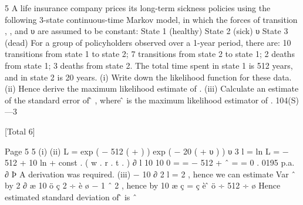 \documentclass[a4paper,12pt]{article}
\begin{document}
5
A life insurance company prices its long-term sickness policies using the following
3-state continuous-time Markov model, in which the forces of transition \sigma, \rho, \mu
and υ are assumed to be constant:
\sigma
State 1
(healthy)
\mu
State 2
(sick)
\rho
υ
State 3
(dead)
For a group of policyholders observed over a 1-year period, there are:
10 transitions from state 1 to state 2;
7 transitions from state 2 to state 1;
2 deaths from state 1;
3 deaths from state 2.
The total time spent in state 1 is 512 years, and in state 2 is 20 years.
(i) Write down the likelihood function for these data. 
(ii) Hence derive the maximum likelihood estimate of \sigma. 
(iii) Calculate an estimate of the standard error of \sigmâ , where \sigmâ is the
maximum likelihood estimator of \sigma .
104(S)—3

[Total 6]


Page 5%
5
(i)
(ii)
L = exp ( − 512 ( \sigma + \mu ) ) exp ( − 20 ( \rho + υ ) )    υ 3
l = ln L = − 512 \sigma + 10 ln \sigma + const . ( w . r . t . \sigma )
∂ l
10
10
0 =
= − 512 +
\sigma ˆ =
= 0 . 0195 p.a.
∂ \sigma
{}
Þ
A derivation was required.
(iii)
−
10
∂ 2 l
= 2 , hence we can estimate Var \sigma ˆ by
2
∂ \sigma
\sigma
æ 10 ö
ç 2 ÷
è \sigma ø
− 1
\sigma ˆ 2
, hence by
10
æ
ç =
ç
è
\sigmâ ö
÷
512 ÷ ø
Hence estimated standard deviation of \sigmâ is \sigma ˆ
\end{document}
